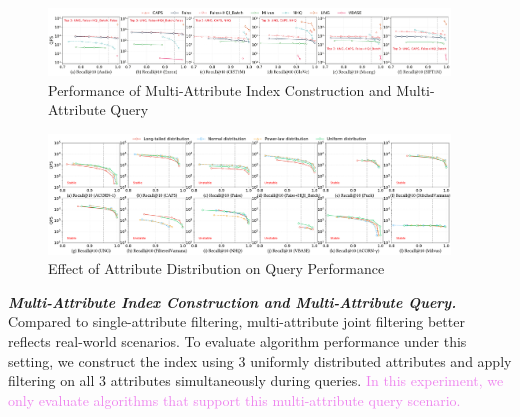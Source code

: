 \documentclass[sigconf, nonacm]{acmart}
\begin{document}
{	
	\begin{figure}
		\centering
		
		\includegraphics[width=0.95\textwidth]{figures/exp/exp_4_1_MultiLabel_1thread.pdf}
		\caption{Performance of Multi-Attribute Index Construction and Multi-Attribute Query}
		\label{fig:exp_4_1_MultiLabel_1thread}
	\end{figure}
	
	
	\begin{figure}
	\centering

	\includegraphics[width=0.95\textwidth]{figures/exp/exp_3_1.pdf}
	\caption{
		Effect of Attribute Distribution on Query Performance}
		
	\label{fig:exp_3_1}

	\end{figure}
	
	
	
	
	
	\textit{\textbf{Multi-Attribute Index Construction and Multi-Attribute Query.}}  
	Compared to single-attribute filtering, multi-attribute joint filtering better reflects real-world scenarios. To evaluate algorithm performance under this setting, we construct the index using 3 uniformly distributed attributes and apply filtering on all 3 attributes simultaneously during queries. \textcolor{violet}{In this experiment, we only evaluate algorithms that support this multi-attribute query scenario.}
	
}
\end{document}
